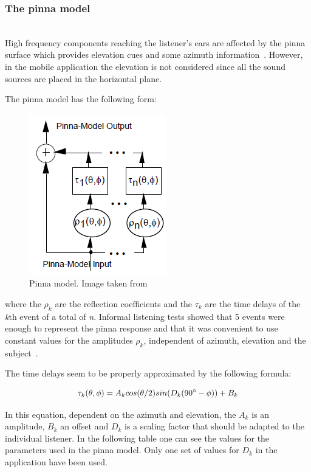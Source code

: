 \documentclass[journal]{IEEEtran}
\begin{document}
\subsubsection{The pinna model}~\\
High frequency components reaching the listener's ears are affected by the pinna surface which provides elevation cues and some azimuth information~\cite{Brown1997}. However, in the mobile application the elevation is not considered since all the sound sources are placed in the horizontal plane. 

The pinna model has the following form:

\begin{figure}[h!]
\centering
\includegraphics[scale=0.75]{graphics/pinna_part.png}
\caption{Pinna model. Image taken from~\cite{Brown1997}}
\label{fig:pinnaModel}
\end{figure}


where the $\rho_{k}$ are the reflection coefficients and the $\tau_{k}$ are the time delays of the \textit{k}th event of a total of \textit{n}. Informal listening tests showed that 5 events were enough to represent the pinna response and that it was convenient to use constant values for the amplitudes $\rho_{k}$, independent of azimuth, elevation and the subject~\cite{Brown1997}. 

The time delays seem to be properly approximated by the following formula:

\begin{equation}\label{eq:pinna}
\tau_{k}(\theta,\phi) = A_{k}cos(\theta/2)sin(D_{k}(90\degree-\phi)) + B_{k}
\end{equation} 

In this equation, dependent on the azimuth and elevation, the $A_{k}$ is an amplitude, $B_{k}$ an offset and $D_{k}$ is a scaling factor that should be adapted to the individual listener. 
In the following table one can see the values for the parameters used in the pinna model. Only one set of values for $D_{k}$ in the application have been used.
\end{document}
